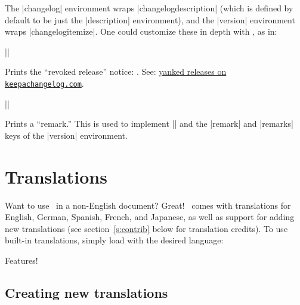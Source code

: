 \documentclass{ltxguidex}
\newcommand{\cl}{\ctan{changelog}}
\begin{document}
The |changelog| environment wraps |changelogdescription| (which is
defined by default to be just the |description| environment), and the
|version| environment wraps |changelogitemize|. One could customize
these in depth with , as in:

\begin{latexcode}
\usepackage{enumitem}
\renewenvironment{changelogitemize}
	{\begin{itemize}[label=---]}
	{\end{itemize}}
\end{latexcode}

\begin{desc}
|\changelogyanked|
\end{desc}
Prints the ``revoked release'' notice:
\changelogyanked. See:
\href{https://keepachangelog.com/en/1.0.0/#yanked}{yanked releases on
\texttt{keepachangelog.com}}.

\begin{desc}
||
\end{desc}
Prints a ``remark.'' This is used to implement |\changelogyanked| and the
|remark| and |remarks| keys of the |version| environment.

\section{Translations}

Want to use \cl\ in a non-English document? Great! \cl\ comes with
translations for English, German, Spanish, French, and Japanese, as well as
support for adding new translations (see section~\ref{s:contrib} below for
translation credits). To use built-in translations, simply load 
with the desired language:
\begin{otherlanguage}{german}
\begin{LTXexample}

\begin{changelog}[section=false, author=Holger Schieferdecker]
  \begin{version}[v=1.0.0]
    \added
      \item Features!
  \end{version}
\end{changelog}
\end{LTXexample}
\end{otherlanguage}

\subsection{Creating new translations}
\end{document}
